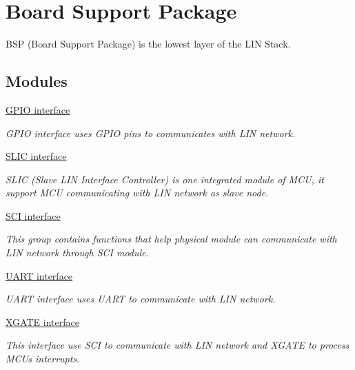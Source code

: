 \hypertarget{group__bsp__group}{}\section{Board Support Package}
\label{group__bsp__group}


B\+S\+P (Board Support Package) is the lowest layer of the L\+I\+N Stack.  


\subsection*{Modules}
\begin{DoxyCompactItemize}
\item 
\hyperlink{group___g_p_i_o__group}{G\+P\+I\+O interface}
\begin{DoxyCompactList}\small\item\em G\+P\+I\+O interface uses G\+P\+I\+O pins to communicates with L\+I\+N network. \end{DoxyCompactList}\item 
\hyperlink{group___s_l_i_c__group}{S\+L\+I\+C interface}
\begin{DoxyCompactList}\small\item\em S\+L\+I\+C (Slave L\+I\+N Interface Controller) is one integrated module of M\+C\+U, it support M\+C\+U communicating with L\+I\+N network as slave node. \end{DoxyCompactList}\item 
\hyperlink{group___s_c_i__group}{S\+C\+I interface}
\begin{DoxyCompactList}\small\item\em This group contains functions that help physical module can communicate with L\+I\+N network through S\+C\+I module. \end{DoxyCompactList}\item 
\hyperlink{group___u_a_r_t__group}{U\+A\+R\+T interface}
\begin{DoxyCompactList}\small\item\em U\+A\+R\+T interface uses U\+A\+R\+T to communicate with L\+I\+N network. \end{DoxyCompactList}\item 
\hyperlink{group___x_g_a_t_e__group}{X\+G\+A\+T\+E interface}
\begin{DoxyCompactList}\small\item\em This interface use S\+C\+I to communicate with L\+I\+N network and X\+G\+A\+T\+E to process M\+C\+U\textquotesingle{}s interrupts. \end{DoxyCompactList}\item 

\end{DoxyCompactItemize}
